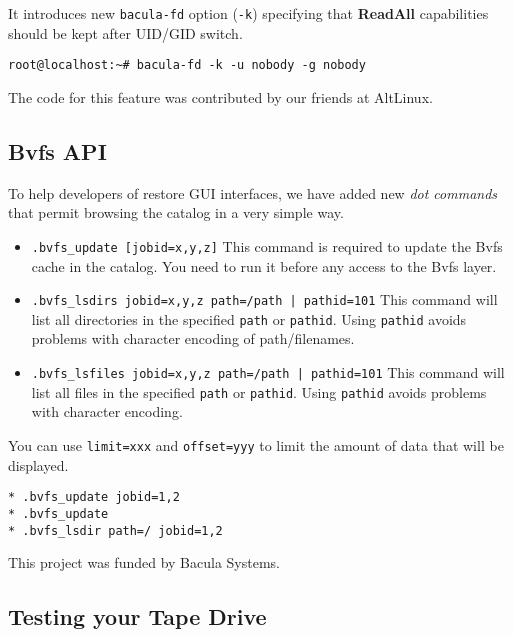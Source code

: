 It introduces new \texttt{bacula-fd} option (\texttt{-k}) specifying that
\textbf{ReadAll} capabilities should be kept after UID/GID switch.

\begin{verbatim}
root@localhost:~# bacula-fd -k -u nobody -g nobody
\end{verbatim}

The code for this feature was contributed by our friends at AltLinux.

\subsection{Bvfs API}
\label{sec:bvfs}

To help developers of restore GUI interfaces, we have added new \textsl{dot
  commands} that permit browsing the catalog in a very simple way.

\begin{itemize}
\item \texttt{.bvfs\_update [jobid=x,y,z]} This command is required to update
  the Bvfs cache in the catalog. You need to run it before any access to the
  Bvfs layer.

\item \texttt{.bvfs\_lsdirs jobid=x,y,z path=/path | pathid=101} This command
  will list all directories in the specified \texttt{path} or
  \texttt{pathid}. Using \texttt{pathid} avoids problems with character
  encoding of path/filenames.

\item \texttt{.bvfs\_lsfiles jobid=x,y,z path=/path | pathid=101} This command
  will list all files in the specified \texttt{path} or \texttt{pathid}. Using
  \texttt{pathid} avoids problems with character encoding.
\end{itemize}

You can use \texttt{limit=xxx} and \texttt{offset=yyy} to limit the amount of
data that will be displayed.

\begin{verbatim}
* .bvfs_update jobid=1,2
* .bvfs_update
* .bvfs_lsdir path=/ jobid=1,2
\end{verbatim}

This project was funded by Bacula Systems.

\subsection{Testing your Tape Drive}
\label{sec:btapespeed}

